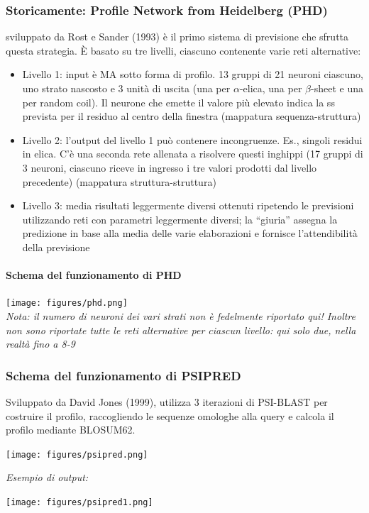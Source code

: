 \documentclass{article}
\begin{document}
\subsubsection{Storicamente: Profile Network from Heidelberg (PHD)}
sviluppato da
Rost e Sander (1993) è il primo sistema di previsione che sfrutta
questa strategia. È basato su tre livelli, ciascuno contenente varie
reti alternative:
\begin{itemize}
    \item Livello 1: input è MA sotto forma di profilo. 13 gruppi di 21 neuroni ciascuno, uno
    strato nascosto e 3 unità di uscita (una per $\alpha$-elica, una per $\beta$-sheet e una per
    random coil). Il neurone che emette il valore più elevato indica la ss prevista per il
    residuo al centro della finestra (mappatura sequenza-struttura)
    \item Livello 2: l'output del livello 1 può contenere incongruenze. Es., singoli residui in
    elica. C'è una seconda rete allenata a risolvere questi inghippi (17 gruppi di 3
    neuroni, ciascuno riceve in ingresso i tre valori prodotti dal livello precedente)
    (mappatura struttura-struttura)
    \item Livello 3: media risultati leggermente diversi ottenuti ripetendo le previsioni
    utilizzando reti con parametri leggermente diversi; la “giuria” assegna la
    predizione in base alla media delle varie elaborazioni e fornisce l'attendibilità
    della previsione
\end{itemize}
\paragraph{Schema del funzionamento di PHD}
\begin{center}
    \texttt{[image: figures/phd.png]}\\
    \textit{Nota: il numero di neuroni dei vari strati non è fedelmente riportato qui! Inoltre non
    sono riportate tutte le reti alternative per ciascun livello: qui solo due, nella realtà fino
    a 8-9}
\end{center}
\subsubsection{Schema del funzionamento di PSIPRED}
Sviluppato da David Jones (1999), utilizza 3 iterazioni di PSI-BLAST per
costruire il profilo, raccogliendo le sequenze omologhe alla query e
calcola il profilo mediante BLOSUM62.
\begin{center}
    \texttt{[image: figures/psipred.png]}
\end{center}
\textit{Esempio di output:}
\begin{center}
    \texttt{[image: figures/psipred1.png]}
\end{center}
\end{document}
